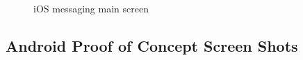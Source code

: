 	\begin{figure}[tbh]
	\begin{center}
	\end{center}
	\caption{iOS messaging main screen \label{iOSmessagingMain}}
	\end{figure}


\subsection{Android  Proof of Concept Screen Shots}

